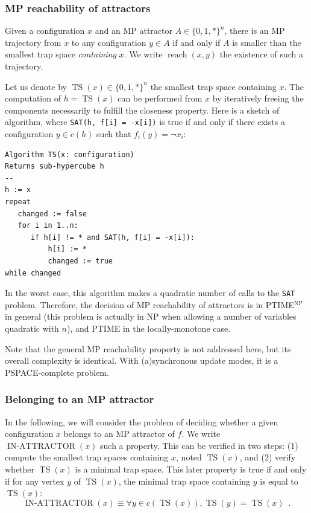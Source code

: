 \documentclass[PCJ,Unicode,screen,mode=plain]{cedram}
\begin{document}
\hypertarget{mp-reachability-of-attractors}{%
\subsubsection{MP reachability of
attractors}\label{mp-reachability-of-attractors}}

Given a configuration \(x\) and an MP attractor \(A\in \{0,1,*\}^n\),
there is an MP trajectory from \(x\) to any configuration \(y\in A\) if
and only if \(A\) is smaller than the smallest trap space
\emph{containing} \(x\). We write \(\operatorname{reach}(x,y)\) the
existence of such a trajectory.

Let us denote by \(\operatorname{TS}(x) \in \{0,1,*\}^n\) the smallest
trap space containing \(x\). The computation of
\(h=\operatorname{TS}(x)\) can be performed from \(x\) by iteratively
freeing the components necessarily to fulfill the closeness property.
Here is a sketch of algorithm, where
\texttt{SAT(h,\ f{[}i{]}\ =\ -x{[}i{]})} is true if and only if there
exists a configuration \(y\in c(h)\) such that \(f_i(y)=\neg x_i\):

\begin{verbatim}
Algorithm TS(x: configuration)
Returns sub-hypercube h
--
h := x
repeat
   changed := false
   for i in 1..n:
      if h[i] != * and SAT(h, f[i] = -x[i]):
          h[i] := *
          changed := true
while changed
\end{verbatim}

In the worst case, this algorithm makes a quadratic number of calls to
the \texttt{SAT} problem. Therefore, the decision of MP reachability of
attractors is in PTIME\(^\text{NP}\) in general (this problem is
  actually in NP when allowing a number of variables quadratic with
  \(n\)), and PTIME in the locally-monotone case.

Note that the general MP reachability property is not addressed here,
but its overall complexity is identical. With (a)synchronous update
modes, it is a PSPACE-complete problem.

\hypertarget{belonging-to-an-mp-attractor}{%
\subsubsection{Belonging to an MP
attractor}\label{belonging-to-an-mp-attractor}}

In the following, we will consider the problem of deciding whether a
given configuration \(x\) belongs to an MP attractor of \(f\). We write
\(\operatorname{IN-ATTRACTOR}(x)\) such a property. This can be verified
in two steps: (1) compute the smallest trap spaces containing \(x\),
noted \(\operatorname{TS}(x)\), and (2) verify whether
\(\operatorname{TS}(x)\) is a minimal trap space. This later property is
true if and only if for any vertex \(y\) of \(\operatorname{TS}(x)\),
the minimal trap space containing \(y\) is equal to
\(\operatorname{TS}(x)\): \[
\operatorname{IN-ATTRACTOR}(x) \equiv \forall y \in c(\operatorname{TS}(x)), \operatorname{TS}(y) = \operatorname{TS}(x) \enspace.
\]
\end{document}
